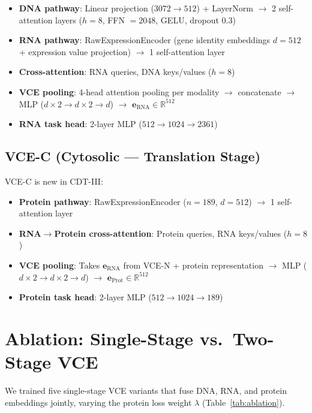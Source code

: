 \documentclass{article}
\begin{document}
\begin{itemize}
    \item \textbf{DNA pathway}: Linear projection ($3072 \to 512$) + LayerNorm $\to$ 2 self-attention layers ($h=8$, FFN $= 2048$, GELU, dropout 0.3)
    \item \textbf{RNA pathway}: RawExpressionEncoder (gene identity embeddings $d=512$ + expression value projection) $\to$ 1 self-attention layer
    \item \textbf{Cross-attention}: RNA queries, DNA keys/values ($h=8$)
    \item \textbf{VCE pooling}: 4-head attention pooling per modality $\to$ concatenate $\to$ MLP ($d \times 2 \to d \times 2 \to d$) $\to$ $\mathbf{e}_{\text{RNA}} \in \mathbb{R}^{512}$
    \item \textbf{RNA task head}: 2-layer MLP ($512 \to 1024 \to 2361$)
\end{itemize}

\subsection{VCE-C (Cytosolic --- Translation Stage)}

VCE-C is new in CDT-III:

\begin{itemize}
    \item \textbf{Protein pathway}: RawExpressionEncoder ($n=189$, $d=512$) $\to$ 1 self-attention layer
    \item \textbf{RNA$\to$Protein cross-attention}: Protein queries, RNA keys/values ($h=8$)
    \item \textbf{VCE pooling}: Takes $\mathbf{e}_{\text{RNA}}$ from VCE-N + protein representation $\to$ MLP ($d \times 2 \to d \times 2 \to d$) $\to$ $\mathbf{e}_{\text{Prot}} \in \mathbb{R}^{512}$
    \item \textbf{Protein task head}: 2-layer MLP ($512 \to 1024 \to 189$)
\end{itemize}

\section{Ablation: Single-Stage vs.\ Two-Stage VCE}
\label{app:ablation}

We trained five single-stage VCE variants that fuse DNA, RNA, and protein embeddings jointly, varying the protein loss weight $\lambda$ (Table~\ref{tab:ablation}).
\end{document}
